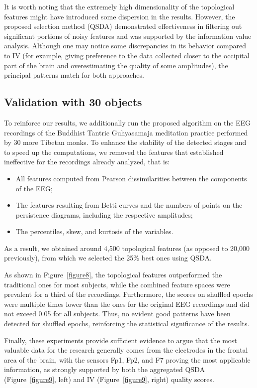 \documentclass[shortAfour,times,sagev]{sagej}
\begin{document}
It is worth noting that the extremely high dimensionality of the topological
features might have introduced some dispersion in the results. However, the
proposed selection method (QSDA) demonstrated effectiveness in filtering out
significant portions of noisy features and was supported by the information
value analysis. Although one may notice some discrepancies in its behavior
compared to IV (for example, giving preference to the data collected closer
to the occipital part of the brain and overestimating the quality of some
amplitudes), the principal patterns match for both approaches.

\subsection{Validation with 30 objects}

To reinforce our results, we additionally run the proposed algorithm on the
EEG recordings of the Buddhist Tantric Guhyasamaja meditation practice
performed by 30 more Tibetan monks. To enhance the stability of the detected
stages and to speed up the computations, we removed the features that established
ineffective for the recordings already analyzed, that is:
\begin{itemize}
    \item 
        All features computed from Pearson dissimilarities between the components of the EEG;\@
    \item 
        The features resulting from Betti curves and the numbers of points on the persistence
        diagrams, including the respective amplitudes;
    \item 
        The percentiles, skew, and kurtosis of the variables.
\end{itemize}

As a result, we obtained around 4,500 topological features (as opposed to 20,000 previously),
from which we selected the 25\% best ones using QSDA.\@

As shown in Figure~\ref{figure8}, the topological features outperformed the traditional ones
for most subjects, while the combined feature spaces were prevalent for a third
of the recordings. Furthermore, the scores on shuffled epochs were multiple times
lower than the ones for the original EEG recordings and did not exceed 0.05 for
all subjects. Thus, no evident good patterns have been detected for shuffled epochs,
reinforcing the statistical significance of the results.


Finally, these experiments provide sufficient evidence to argue that the most valuable
data for the research generally comes from the electrodes in the frontal area of the
brain, with the sensors Fp1, Fp2, and F7 proving the most applicable information,
as strongly supported by both the aggregated QSDA (Figure~\ref{figure9}, left) and IV
(Figure~\ref{figure9}, right) quality scores.
\end{document}
